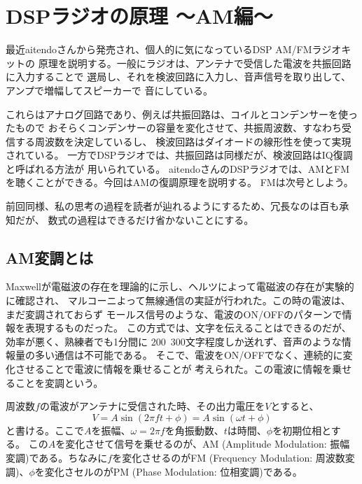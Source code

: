 \chapter*{DSPラジオの原理 〜AM編〜}
最近aitendoさんから発売され、個人的に気になっているDSP AM/FMラジオキットの
原理を説明する。一般にラジオは、アンテナで受信した電波を共振回路に入力することで
選局し、それを検波回路に入力し、音声信号を取り出して、アンプで増幅してスピーカーで
音にしている。

これらはアナログ回路であり、例えば共振回路は、コイルとコンデンサーを使ったもので
おそらくコンデンサーの容量を変化させて、共振周波数、すなわち受信する周波数を決定しているし、
検波回路はダイオードの線形性を使って実現されている。
一方でDSPラジオでは、共振回路は同様だが、検波回路はIQ復調と呼ばれる方法が
用いられている。
aitendoさんのDSPラジオでは、AMとFMを聴くことができる。今回はAMの復調原理を説明する。
FMは次号としよう。

前回同様、私の思考の過程を読者が辿れるようにするため、冗長なのは百も承知だが、
数式の過程はできるだけ省かないことにする。


\section*{AM変調とは}
Maxwellが電磁波の存在を理論的に示し、ヘルツによって電磁波の存在が実験的に確認され、
マルコーニよって無線通信の実証が行われた。この時の電波は、まだ変調されておらず
モールス信号のような、電波のON/OFFのパターンで情報を表現するものだった。
この方式では、文字を伝えることはできるのだが、効率が悪く、熟練者でも1分間に
200~300文字程度しか送れず、音声のような情報量の多い通信は不可能である。
そこで、電波をON/OFFでなく、連続的に変化させることで電波に情報を乗せることが
考えられた。この電波に情報を乗せることを変調という。

周波数$f$の電波がアンテナに受信された時、その出力電圧を$V$とすると、
\begin{equation}
V = A\sin(2 \pi f t + \phi) = A\sin(\omega t + \phi)
\end{equation}
と書ける。ここで$A$を振幅、$\omega=2\pi f$を角振動数、$t$は時間、$\phi$を初期位相とする。
この$A$を変化させて信号を乗せるのが、AM (Amplitude Modulation: 振幅変調)である。ちなみに$f$を変化させるのがFM (Frequency Modulation: 周波数変調)、$\phi$を変化さセルのがPM (Phase Modulation: 位相変調)である。

